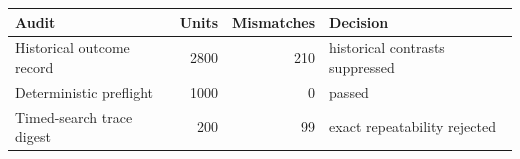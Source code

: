 \begin{tabular}{lrrl}
\toprule
Audit & Units & Mismatches & Decision \\
\midrule
Historical outcome record & 2800 & 210 & historical contrasts suppressed \\
Deterministic preflight & 1000 & 0 & passed \\
Timed-search trace digest & 200 & 99 & exact repeatability rejected \\
\bottomrule
\end{tabular}
